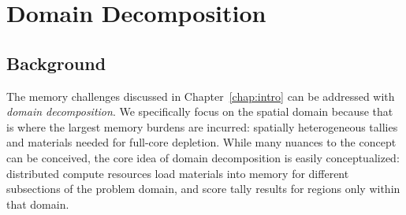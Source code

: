 \chapter{Domain Decomposition}
\label{chap:dd}

\section{Background}

The memory challenges discussed in Chapter~\ref{chap:intro} can be addressed
with \emph{domain decomposition}. We specifically focus on the spatial domain
because that is where the largest memory burdens are incurred: spatially
heterogeneous tallies and materials needed for full-core depletion. While many
nuances to the concept can be conceived, the core idea of domain
decomposition is easily conceptualized: distributed compute resources load
materials into memory for different subsections of the problem domain, and score
tally results for regions only within that domain.



